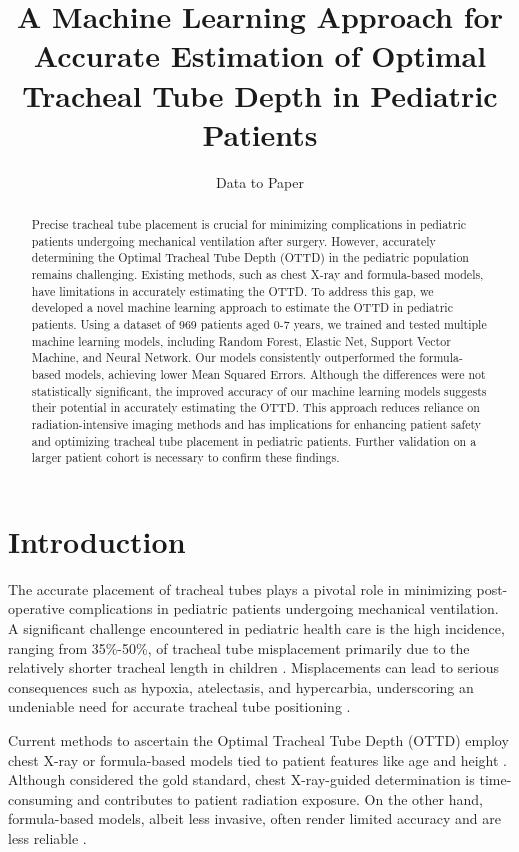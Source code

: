 \documentclass[11pt]{article}
\title{A Machine Learning Approach for Accurate Estimation of Optimal Tracheal Tube Depth in Pediatric Patients}
\author{Data to Paper}
\begin{document}
\maketitle
\begin{abstract}
Precise tracheal tube placement is crucial for minimizing complications in pediatric patients undergoing mechanical ventilation after surgery. However, accurately determining the Optimal Tracheal Tube Depth (OTTD) in the pediatric population remains challenging. Existing methods, such as chest X-ray and formula-based models, have limitations in accurately estimating the OTTD. To address this gap, we developed a novel machine learning approach to estimate the OTTD in pediatric patients. Using a dataset of 969 patients aged 0-7 years, we trained and tested multiple machine learning models, including Random Forest, Elastic Net, Support Vector Machine, and Neural Network. Our models consistently outperformed the formula-based models, achieving lower Mean Squared Errors. Although the differences were not statistically significant, the improved accuracy of our machine learning models suggests their potential in accurately estimating the OTTD. This approach reduces reliance on radiation-intensive imaging methods and has implications for enhancing patient safety and optimizing tracheal tube placement in pediatric patients. Further validation on a larger patient cohort is necessary to confirm these findings.
\end{abstract}
\section*{Introduction}

The accurate placement of tracheal tubes plays a pivotal role in minimizing post-operative complications in pediatric patients undergoing mechanical ventilation. A significant challenge encountered in pediatric health care is the high incidence, ranging from 35\%-50\%, of tracheal tube misplacement primarily due to the relatively shorter tracheal length in children \cite{Uya2020PointofCareUI, Rost2022TrachealTM}. Misplacements can lead to serious consequences such as hypoxia, atelectasis, and hypercarbia, underscoring an undeniable need for accurate tracheal tube positioning \cite{Kapsner1993TheED, Massoth2020NasolaryngealDI}.

Current methods to ascertain the Optimal Tracheal Tube Depth (OTTD) employ chest X-ray or formula-based models tied to patient features like age and height \cite{Nguyen2016AccuracyOA, Faigle2015NovelSP}. Although considered the gold standard, chest X-ray-guided determination is time-consuming and contributes to patient radiation exposure. On the other hand, formula-based models, albeit less invasive, often render limited accuracy and are less reliable \cite{Bang2021UseOE, Gharpure2000IndicatorsOP}.
\end{document}

